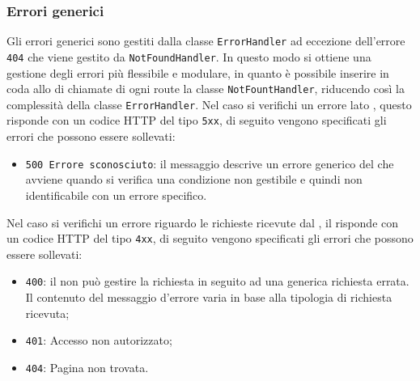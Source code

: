 \subsubsection{Errori generici}
Gli errori generici sono gestiti dalla classe \texttt{ErrorHandler} ad eccezione dell'errore \texttt{404} che viene gestito da \texttt{NotFoundHandler}.
In questo modo si ottiene una gestione degli errori più flessibile e modulare, in quanto è possibile inserire in coda allo  di chiamate di ogni route la classe \texttt{NotFountHandler}, riducendo così la complessità della classe \texttt{ErrorHandler}.
Nel caso si verifichi un errore lato , questo risponde con un codice HTTP del tipo \texttt{5xx}, di seguito vengono specificati gli errori che possono essere sollevati:
\begin{itemize}
\item \texttt{500 Errore sconosciuto}: il messaggio descrive un errore generico del  che avviene quando si verifica una condizione non gestibile e quindi non identificabile con un errore specifico.
\end{itemize}
Nel caso si verifichi un errore riguardo le richieste ricevute dal , il  risponde con un codice HTTP del tipo \texttt{4xx}, di seguito vengono specificati gli errori che possono essere sollevati:
\begin{itemize}
\item \texttt{400}: il  non può gestire la richiesta in seguito ad una generica richiesta errata. Il contenuto del messaggio d'errore varia in base alla tipologia di richiesta ricevuta;
\item \texttt{401}: Accesso non autorizzato;
\item \texttt{404}: Pagina non trovata.
\end{itemize}
